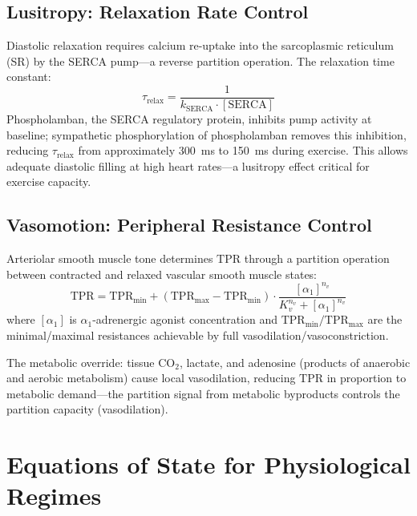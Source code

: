 \documentclass[10pt,twocolumn,a4paper]{article}
\theoremstyle{remark}
\newcommand{\TPR}{\mathrm{TPR}}
\begin{document}
\subsection{Lusitropy: Relaxation Rate Control}

Diastolic relaxation requires calcium re-uptake into the sarcoplasmic reticulum (SR) by the SERCA pump—a reverse partition operation. The relaxation time constant:
\begin{equation}
    \tau_{\mathrm{relax}} = \frac{1}{k_{\mathrm{SERCA}} \cdot [\mathrm{SERCA}]}
    \label{eq:lusitropy}
\end{equation}
Phospholamban, the SERCA regulatory protein, inhibits pump activity at baseline; sympathetic phosphorylation of phospholamban removes this inhibition, reducing $\tau_{\mathrm{relax}}$ from approximately 300~ms to 150~ms during exercise. This allows adequate diastolic filling at high heart rates—a lusitropy effect critical for exercise capacity.

\subsection{Vasomotion: Peripheral Resistance Control}

Arteriolar smooth muscle tone determines $\TPR$ through a partition operation between contracted and relaxed vascular smooth muscle states:
\begin{equation}
    \TPR = \TPR_{\mathrm{min}} + (\TPR_{\mathrm{max}} - \TPR_{\mathrm{min}}) \cdot \frac{[\alpha_1]^{n_v}}{K_v^{n_v} + [\alpha_1]^{n_v}}
    \label{eq:vasomotion}
\end{equation}
where $[\alpha_1]$ is $\alpha_1$-adrenergic agonist concentration and $\TPR_{\mathrm{min}}/\TPR_{\mathrm{max}}$ are the minimal/maximal resistances achievable by full vasodilation/vasoconstriction.

The metabolic override: tissue $\mathrm{CO}_2$, lactate, and adenosine (products of anaerobic and aerobic metabolism) cause local vasodilation, reducing $\TPR$ in proportion to metabolic demand—the partition signal from metabolic byproducts controls the partition capacity (vasodilation).

\section{Equations of State for Physiological Regimes}
\label{sec:eos}
\end{document}
